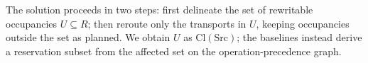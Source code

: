 The solution proceeds in two steps: first delineate the set of rewritable occupancies \(U\subseteq R\);
then reroute only the transports in \(U\), keeping occupancies outside the set as planned.
We obtain \(U\) as \(\mathrm{Cl}(\mathrm{Src})\); the baselines instead derive a reservation subset from the affected set on the operation-precedence graph.

